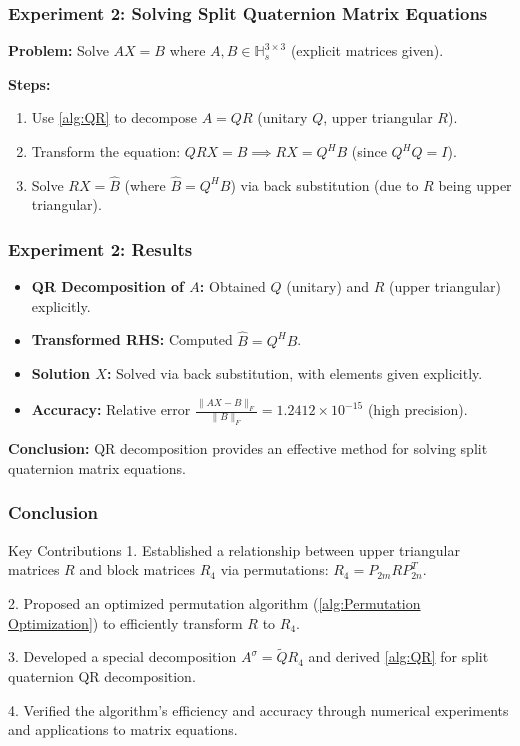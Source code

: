 \documentclass{beamer}
\begin{document}
\begin{frame}
    \frametitle{Experiment 2: Solving Split Quaternion Matrix Equations}
    \textbf{Problem:} Solve \( AX = B \) where \( A,B \in \mathbb{H}_s^{3 \times 3} \) (explicit matrices given).
    
    \vspace{0.3cm}
    \textbf{Steps:}
    \begin{enumerate}
        \item Use \ref{alg:QR} to decompose \( A = QR \) (unitary \( Q \), upper triangular \( R \)).
        \item Transform the equation: \( QRX = B \implies RX = Q^H B \) (since \( Q^H Q = I \)).
        \item Solve \( RX = \widehat{B} \) (where \( \widehat{B} = Q^H B \)) via back substitution (due to \( R \) being upper triangular).
    \end{enumerate}
\end{frame}

\begin{frame}
    \frametitle{Experiment 2: Results}
    \begin{itemize}
        \item \textbf{QR Decomposition of \( A \):} Obtained \( Q \) (unitary) and \( R \) (upper triangular) explicitly.
        \item \textbf{Transformed RHS:} Computed \( \widehat{B} = Q^H B \).
        \item \textbf{Solution \( X \):} Solved via back substitution, with elements given explicitly.
        \item \textbf{Accuracy:} Relative error \( \frac{\|AX - B\|_F}{\|B\|_F} = 1.2412 \times 10^{-15} \) (high precision).
    \end{itemize}
    
    \vspace{0.3cm}
    \textbf{Conclusion:} QR decomposition provides an effective method for solving split quaternion matrix equations.
\end{frame}

\begin{frame}
    \frametitle{Conclusion}
    \begin{block}{Key Contributions}
        1. Established a relationship between upper triangular matrices \( R \) and block matrices \( R_4 \) via permutations: \( R_4 = P_{2m} R P_{2n}^T \).
        
        2. Proposed an optimized permutation algorithm (\ref{alg:Permutation Optimization}) to efficiently transform \( R \) to \( R_4 \).
        
        3. Developed a special decomposition \( A^\sigma = \widetilde{Q} R_4 \) and derived \ref{alg:QR} for split quaternion QR decomposition.
        
        4. Verified the algorithm's efficiency and accuracy through numerical experiments and applications to matrix equations.
    \end{block}
\end{frame}
\end{document}
